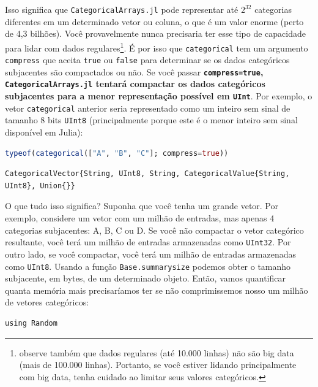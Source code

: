 \documentclass[
  notoc %
]{tufte-book}
\newcommand{\passthrough}[1]{#1}
\begin{document}
Isso significa que \passthrough{\lstinline!CategoricalArrays.jl!} pode
representar até \(2^{32}\) categorias diferentes em um determinado vetor
ou coluna, o que é um valor enorme (perto de 4,3 bilhões). Você
provavelmente nunca precisaria ter esse tipo de capacidade para lidar
com dados regulares\footnote{observe também que dados regulares (até
  10.000 linhas) não são big data (mais de 100.000 linhas). Portanto, se
  você estiver lidando principalmente com big data, tenha cuidado ao
  limitar seus valores categóricos.}. É por isso que
\passthrough{\lstinline!categorical!} tem um argumento
\passthrough{\lstinline!compress!} que aceita
\passthrough{\lstinline!true!} ou \passthrough{\lstinline!false!} para
determinar se os dados categóricos subjacentes são compactados ou não.
Se você passar \textbf{\passthrough{\lstinline!compress=true!},
\passthrough{\lstinline!CategoricalArrays.jl!} tentará compactar os
dados categóricos subjacentes para a menor representação possível em
\passthrough{\lstinline!UInt!}}. Por exemplo, o vetor
\passthrough{\lstinline!categorical!} anterior seria representado como
um inteiro sem sinal de tamanho 8 bits \passthrough{\lstinline!UInt8!}
(principalmente porque este é o menor inteiro sem sinal disponível em
Julia):

\begin{lstlisting}[language=Julia]
typeof(categorical(["A", "B", "C"]; compress=true))
\end{lstlisting}

\begin{lstlisting}
CategoricalVector{String, UInt8, String, CategoricalValue{String, UInt8}, Union{}}
\end{lstlisting}

O que tudo isso significa? Suponha que você tenha um grande vetor. Por
exemplo, considere um vetor com um milhão de entradas, mas apenas 4
categorias subjacentes: A, B, C ou D. Se você não compactar o vetor
categórico resultante, você terá um milhão de entradas armazenadas como
\passthrough{\lstinline!UInt32!}. Por outro lado, se você compactar,
você terá um milhão de entradas armazenadas como
\passthrough{\lstinline!UInt8!}. Usando a função
\passthrough{\lstinline!Base.summarysize!} podemos obter o tamanho
subjacente, em bytes, de um determinado objeto. Então, vamos quantificar
quanta memória mais precisaríamos ter se não comprimissemos nosso um
milhão de vetores categóricos:

\begin{lstlisting}
using Random
\end{lstlisting}
\end{document}

